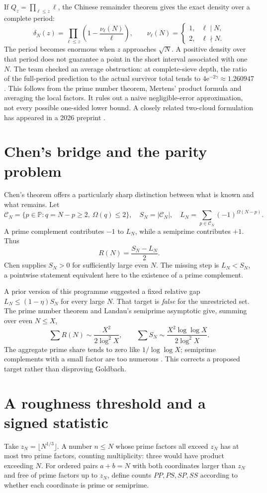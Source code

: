 \documentclass[11pt,a4paper]{article}
\newcommand{\PP}{\mathbb P}
\newcommand{\Om}{\Omega}
\newcommand{\e}{\mathrm e}
\begin{document}
If $Q_z=\prod_{\ell\le z}\ell$, the Chinese remainder theorem gives the exact density over a complete period:
\[
 \delta_N(z)=\prod_{\ell\le z}\left(1-\frac{\nu_\ell(N)}{\ell}\right),
 \qquad \nu_\ell(N)=\begin{cases}1,&\ell\mid N,\\2,&\ell\nmid N.\end{cases}
\]
The period becomes enormous when $z$ approaches $\sqrt N$. A positive density over that period does not guarantee a point in the short interval associated with one $N$. The team checked an average obstruction: at complete-sieve depth, the ratio of the full-period prediction to the actual survivor total tends to $4\e^{-2\gamma}\approx1.260947$. This follows from the prime number theorem, Mertens' product formula and averaging the local factors. It rules out a naive negligible-error approximation, not every possible one-sided lower bound. A closely related two-cloud formulation has appeared in a 2026 preprint \cite{twocloud}.

\section{Chen's bridge and the parity problem}
Chen's theorem offers a particularly sharp distinction between what is known and what remains. Let
\[
 \mathcal C_N=\{p\in\PP:q=N-p\ge2,\ \Om(q)\le2\},\quad
 S_N=|\mathcal C_N|,\quad
 L_N=\sum_{p\in\mathcal C_N}(-1)^{\Om(N-p)}.
\]
A prime complement contributes $-1$ to $L_N$, while a semiprime contributes $+1$. Thus
\begin{equation}\label{eq:chen}
 \boxed{R(N)=\frac{S_N-L_N}{2}}.
\end{equation}
Chen supplies $S_N>0$ for sufficiently large even $N$. The missing step is $L_N<S_N$, a pointwise statement equivalent here to the existence of a prime complement.

A prior version of this programme suggested a fixed relative gap $L_N\le(1-\eta)S_N$ for every large $N$. That target is \emph{false} for the unrestricted set. The prime number theorem and Landau's semiprime asymptotic give, summing over even $N\le X$,
\[
 \sum R(N)\sim\frac{X^2}{2\log^2 X},\qquad
 \sum S_N\sim\frac{X^2\log\log X}{2\log^2 X}.
\]
The aggregate prime share tends to zero like $1/\log\log X$; semiprime complements with a small factor are too numerous \cite{semiprime}. This corrects a proposed target rather than disproving Goldbach.

\section{A roughness threshold and a signed statistic}
Take $z_N=\lfloor N^{1/3}\rfloor$. A number $n\le N$ whose prime factors all exceed $z_N$ has at most two prime factors, counting multiplicity: three would have product exceeding $N$. For ordered pairs $a+b=N$ with both coordinates larger than $z_N$ and free of prime factors up to $z_N$, define counts $PP,PS,SP,SS$ according to whether each coordinate is prime or semiprime.
\end{document}
